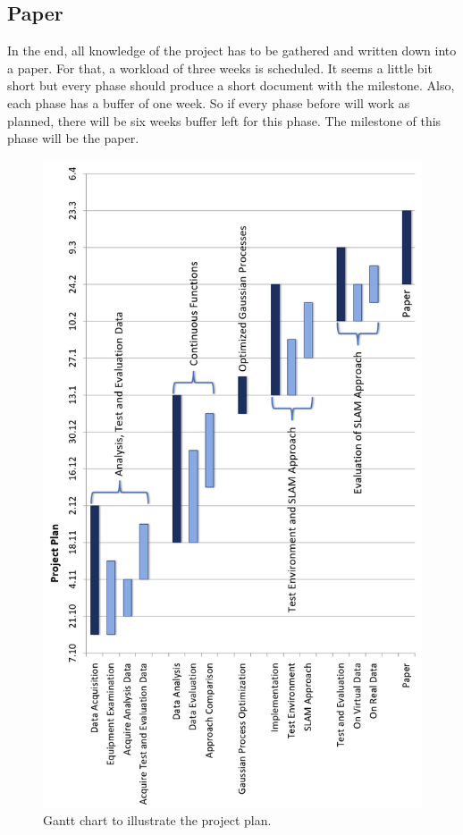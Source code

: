 \subsection{Paper}
In the end, all knowledge of the project has to be gathered and written down into a paper. For that, a workload of three weeks is scheduled. It seems a little bit short but every phase should produce a short document with the milestone. Also, each phase has a buffer of one week. So if every phase before will work as planned, there will be six weeks buffer left for this phase. The milestone of this phase will be the paper. 

\begin{figure}[hp]
	\centering
	\includegraphics[width=\textwidth]{images/projectplan.png}
	\caption{
		Gantt chart to illustrate the project plan.
	}
	\label{fig:workplan}
\end{figure}
\newpage